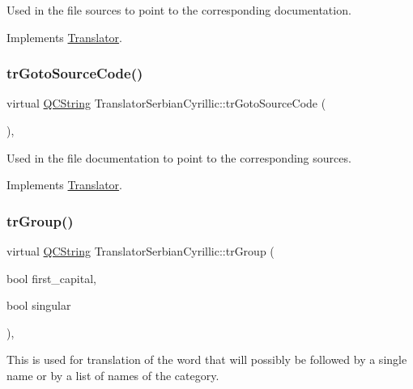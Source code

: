 Used in the file sources to point to the corresponding documentation. 

Implements \mbox{\hyperlink{class_translator}{Translator}}.

\mbox{\label{class_translator_serbian_cyrillic_af8c14c4f370b77b299099f342790f3eb}} 
\subsubsection{\texorpdfstring{trGotoSourceCode()}{trGotoSourceCode()}}
{\footnotesize\ttfamily virtual \mbox{\hyperlink{class_q_c_string}{Q\+C\+String}} Translator\+Serbian\+Cyrillic\+::tr\+Goto\+Source\+Code (\begin{DoxyParamCaption}{ }\end{DoxyParamCaption})\hspace{0.3cm}{\ttfamily [inline]}, {\ttfamily [virtual]}}

Used in the file documentation to point to the corresponding sources. 

Implements \mbox{\hyperlink{class_translator}{Translator}}.

\mbox{\label{class_translator_serbian_cyrillic_ac018e6eee4a3d617597eadb73f7c8405}} 
\subsubsection{\texorpdfstring{trGroup()}{trGroup()}}
{\footnotesize\ttfamily virtual \mbox{\hyperlink{class_q_c_string}{Q\+C\+String}} Translator\+Serbian\+Cyrillic\+::tr\+Group (\begin{DoxyParamCaption}\item[{bool}]{first\+\_\+capital,  }\item[{bool}]{singular }\end{DoxyParamCaption})\hspace{0.3cm}{\ttfamily [inline]}, {\ttfamily [virtual]}}

This is used for translation of the word that will possibly be followed by a single name or by a list of names of the category. 


